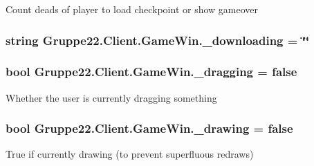 Count deads of player to load checkpoint or show gameover 

\hypertarget{class_gruppe22_1_1_client_1_1_game_win_a1d83df67b1c8ae9796477c3102b4c191}{
\subsubsection[{\-\_\-downloading}]{\setlength{\rightskip}{0pt plus 5cm}string Gruppe22.\-Client.\-Game\-Win.\-\_\-downloading = \char`\"{}\char`\"{}\hspace{0.3cm}{\ttfamily [protected]}}}\label{class_gruppe22_1_1_client_1_1_game_win_a1d83df67b1c8ae9796477c3102b4c191}
\hypertarget{class_gruppe22_1_1_client_1_1_game_win_a076f4987158764233c25585bcf62b730}{
\subsubsection[{\-\_\-dragging}]{\setlength{\rightskip}{0pt plus 5cm}bool Gruppe22.\-Client.\-Game\-Win.\-\_\-dragging = false\hspace{0.3cm}{\ttfamily [protected]}}}\label{class_gruppe22_1_1_client_1_1_game_win_a076f4987158764233c25585bcf62b730}


Whether the user is currently dragging something 

\hypertarget{class_gruppe22_1_1_client_1_1_game_win_a26adf6b2a5887176e083bace5b930d58}{
\subsubsection[{\-\_\-drawing}]{\setlength{\rightskip}{0pt plus 5cm}bool Gruppe22.\-Client.\-Game\-Win.\-\_\-drawing = false\hspace{0.3cm}{\ttfamily [protected]}}}\label{class_gruppe22_1_1_client_1_1_game_win_a26adf6b2a5887176e083bace5b930d58}


True if currently drawing (to prevent superfluous redraws) 

